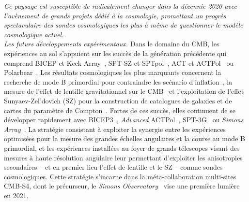 \emph{Ce paysage est susceptible de radicalement changer dans la décennie
2020 avec l'avènement de grands projets dédié à la cosmologie,
promettant un progrès spectaculaire des sondes cosmologiques les plus
à même de questionner le modèle cosmologique actuel.} \\

\emph{Les futurs développements expérimentaux.}
Dans le domaine du CMB, les expériences au sol s'appuient sur les
succès de la génération précédente qui comprend BICEP et Keck
Array~\citep{BK2018}, SPT-SZ et SPTpol~\citep{deHaan2016, SPTpol2019},
ACT et ACTPol~\citep{Swetz2011_ACT, ACTpol2017} ou
Polarbear~\citep{Polarbear2017}. Les résultats cosmologiques les plus
marquants concernent la recherche de mode B primordial pour contraindre les scénario
d'inflation~\citep{BKP2015, BK2016}, la mesure de l'effet de lentille
gravitationnel sur le CMB~\citep[\emph{e.g.}][]{ACT2011_lensing, POLARBEAR2019_lensing,
SPTpol2019_lensing, SPTpol2019_clusterlensing} et l'exploitation de l'effet
Sunyaev-Zel'dovich (SZ) pour la construction de catalogues de galaxies
et de cartes du paramètre de Compton~\citep[\emph{e.g.}][]{Hasselfield2013_ACT_SZ, Dunkley2013, ACTpol2018_SZ, Reichardt2013_SPT_SZ,
George2015, Bleem2015, deHaan2016, Bleem2019, Bocquet2019}. Fortes de ces succès, elles
continuent de se développer rapidement
avec BICEP3~\citep{BICEP3_2018}, \emph{Advanced} ACTPol~\citep{AdvACT2018},
SPT-3G~\citep{SPT3G_2018} ou \emph{Simons Array}~\citep{SA_2016}.
La stratégie consistant à exploiter la synergie
entre les expériences optimisées pour la mesure des grandes échelles
angulaires et la course au mode B primordial, et les expériences
installées au foyer de grands télescopes visant des mesures à haute
résolution angulaire leur permettant d'exploiter les anisotropies
secondaires -- et en premier lieu l'effet de lentille et le SZ --
comme sondes cosmologiques. Cette stratégie s'incarne dans la
méta-collaboration multi-sites CMB-S4, dont le précurseur,
le \emph{Simons Observatory}~\citep{SO2019} vise une première lumière
en 2021.


